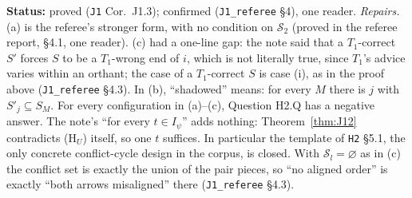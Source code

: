 \documentclass[11pt]{article}
\theoremstyle{definition}
\theoremstyle{remark}
\newcommand{\src}[1]{\texttt{#1}}
\newcommand{\status}[1]{\par\smallskip\noindent\textbf{Status:} #1\par\smallskip}
\begin{document}
\status{proved (\src{J1} Cor.~J1.3); confirmed (\src{J1\_referee} \S4), one reader. \emph{Repairs.} (a) is the referee's stronger form, with no condition on $\mathcal S_2$ (proved in the referee report, \S4.1, one reader). (c) had a one-line gap: the note said that a $T_1$-correct $S'$ forces $S$ to be a $T_1$-wrong end of $i$, which is not literally true, since $T_1$'s advice varies within an orthant; the case of a $T_1$-correct $S$ is case (i), as in the proof above (\src{J1\_referee} \S4.3). In (b), ``shadowed'' means: for every $M$ there is $j$ with $S'_j\subseteq S_M$. For every configuration in (a)--(c), Question H2.Q has a negative answer. The note's ``for every $t\in I_\psi$'' adds nothing: Theorem~\ref{thm:J12} contradicts (H$_U$) itself, so one $t$ suffices. In particular the template of \src{H2} \S5.1, the only concrete conflict-cycle design in the corpus, is closed. With $\mathcal S_l=\varnothing$ as in (c) the conflict set is exactly the union of the pair pieces, so ``no aligned order'' is exactly ``both arrows misaligned'' there (\src{J1\_referee} \S4.3).}
\end{document}
